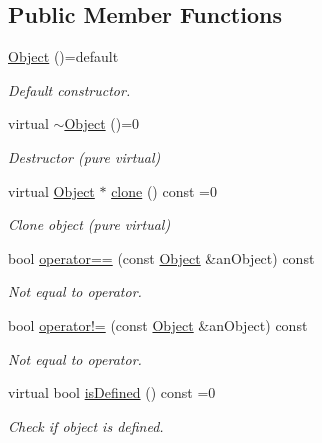 \subsection*{Public Member Functions}
\begin{DoxyCompactItemize}
\item 
\hyperlink{classostk_1_1math_1_1geom_1_1d2_1_1_object_a5e2d37e51e0028b18188078e13932f34}{Object} ()=default
\begin{DoxyCompactList}\small\item\em Default constructor. \end{DoxyCompactList}\item 
virtual \hyperlink{classostk_1_1math_1_1geom_1_1d2_1_1_object_a661d5d407b327b22d3139884a93eebf9}{$\sim$\+Object} ()=0
\begin{DoxyCompactList}\small\item\em Destructor (pure virtual) \end{DoxyCompactList}\item 
virtual \hyperlink{classostk_1_1math_1_1geom_1_1d2_1_1_object}{Object} $\ast$ \hyperlink{classostk_1_1math_1_1geom_1_1d2_1_1_object_a98dedc6792aef35308966ca768eb3e14}{clone} () const =0
\begin{DoxyCompactList}\small\item\em Clone object (pure virtual) \end{DoxyCompactList}\item 
bool \hyperlink{classostk_1_1math_1_1geom_1_1d2_1_1_object_aa26e3719b4b10fc5c65d047a91cf0f51}{operator==} (const \hyperlink{classostk_1_1math_1_1geom_1_1d2_1_1_object}{Object} \&an\+Object) const
\begin{DoxyCompactList}\small\item\em Not equal to operator. \end{DoxyCompactList}\item 
bool \hyperlink{classostk_1_1math_1_1geom_1_1d2_1_1_object_a10e035f09ac34d04901485d494681ff6}{operator!=} (const \hyperlink{classostk_1_1math_1_1geom_1_1d2_1_1_object}{Object} \&an\+Object) const
\begin{DoxyCompactList}\small\item\em Not equal to operator. \end{DoxyCompactList}\item 
virtual bool \hyperlink{classostk_1_1math_1_1geom_1_1d2_1_1_object_a456cc7121218d24c1322d0fe54230cc4}{is\+Defined} () const =0
\begin{DoxyCompactList}\small\item\em Check if object is defined. \end{DoxyCompactList}\item 

\end{DoxyCompactItemize}
